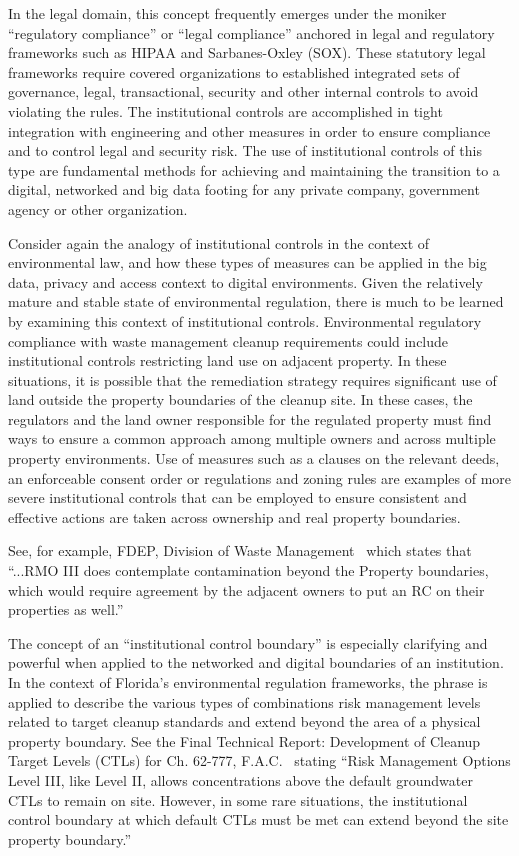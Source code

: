 In the legal domain, this concept frequently emerges under the moniker ``regulatory compliance'' or ``legal compliance'' anchored in legal and regulatory frameworks such as HIPAA and Sarbanes-Oxley (SOX).
These statutory legal frameworks require covered organizations to established integrated sets of governance, legal, transactional, security and other internal controls to avoid violating the rules.
The institutional controls are accomplished in tight integration with engineering and other measures in order to ensure compliance and to control legal and security risk.
The use of institutional controls of this type are fundamental methods for achieving and maintaining the transition to a digital, networked and big data footing for any private company, government agency or other organization.

Consider again the analogy of institutional controls in the context of environmental law, and how these types of measures can be applied in the big data, privacy and access context to digital environments.
Given the relatively mature and stable state of environmental regulation, there is much to be learned by examining this context of institutional controls.
Environmental regulatory compliance with waste management cleanup requirements could include institutional controls restricting land use on adjacent property.
In these situations, it is possible that the remediation strategy requires significant use of land outside the property boundaries of the cleanup site. 
In these cases, the regulators and the land owner responsible for the regulated property must find ways to ensure a common approach among multiple owners and across multiple property environments.
Use of measures such as a clauses on the relevant deeds, an enforceable consent order or regulations and zoning rules are examples of more severe institutional controls that can be employed to ensure consistent and effective actions are taken across ownership and real property boundaries.

See, for example, FDEP, Division of Waste Management~\cite{FloridaEPA2012} which states that
``...RMO III does contemplate contamination beyond the Property boundaries, which would require agreement by the adjacent owners to put an RC on their properties as well.''

The concept of an ``institutional control boundary'' is especially clarifying and powerful when applied to the networked and digital boundaries of an institution.
In the context of Florida's environmental regulation frameworks, the phrase is applied to describe the various types of combinations risk management levels related to target cleanup standards and extend beyond the area of a physical property boundary.
See the Final Technical Report: Development of Cleanup Target Levels (CTLs) for {Ch. 62-777, F.A.C.}~\cite{UFlorida2005} stating
``Risk Management Options Level III, like Level II, allows concentrations above the default groundwater CTLs to remain on site.
However, in some rare situations, the institutional control boundary at which default CTLs must be met can extend beyond the site property boundary.''

